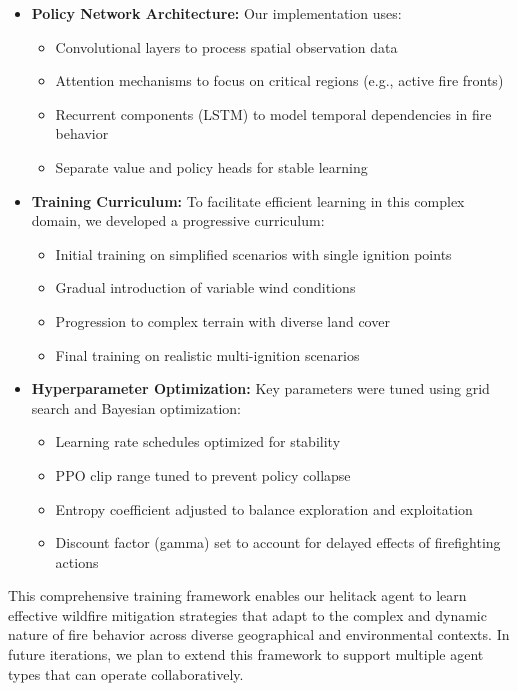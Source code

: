 \documentclass[conference]{IEEEtran}
\begin{document}
\begin{itemize}
    \item \textbf{Policy Network Architecture:} Our implementation uses:
    \begin{itemize}
        \item Convolutional layers to process spatial observation data
        \item Attention mechanisms to focus on critical regions (e.g., active fire fronts)
        \item Recurrent components (LSTM) to model temporal dependencies in fire behavior
        \item Separate value and policy heads for stable learning
    \end{itemize}
    
    \item \textbf{Training Curriculum:} To facilitate efficient learning in this complex domain, we developed a progressive curriculum:
    \begin{itemize}
        \item Initial training on simplified scenarios with single ignition points
        \item Gradual introduction of variable wind conditions
        \item Progression to complex terrain with diverse land cover
        \item Final training on realistic multi-ignition scenarios
    \end{itemize}
    
    \item \textbf{Hyperparameter Optimization:} Key parameters were tuned using grid search and Bayesian optimization:
    \begin{itemize}
        \item Learning rate schedules optimized for stability
        \item PPO clip range tuned to prevent policy collapse
        \item Entropy coefficient adjusted to balance exploration and exploitation
        \item Discount factor (gamma) set to account for delayed effects of firefighting actions
    \end{itemize}
\end{itemize}

\noindent
This comprehensive training framework enables our helitack agent to learn effective wildfire mitigation strategies that adapt to the complex and dynamic nature of fire behavior across diverse geographical and environmental contexts. In future iterations, we plan to extend this framework to support multiple agent types that can operate collaboratively.
\end{document}
